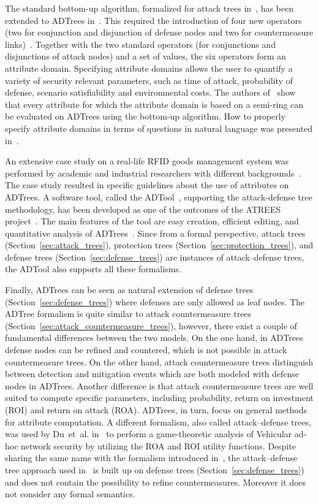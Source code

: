 \documentclass[a4paper]{article}
\begin{document}
The standard bottom-up algorithm, formalized for attack trees in~\cite{MaOo}, 
has been extended to ADTrees in~\cite{KoMaRaSc2}. This required the introduction
of four new operators (two for conjunction and disjunction of defense nodes and
two for countermeasure links)~\cite{KoMaRaSc2}. Together with the two standard
operators (for conjunctions and disjunctions of attack nodes) and a set of
values, the six operators form an attribute domain. Specifying attribute domains
allows the user to quantify a variety of security relevant parameters, such as
time of attack, probability of defense, scenario satisfiability and
environmental costs. The authors of~\cite{KoMaRaSc2} show that every attribute
for which the attribute domain is based on a semi-ring can be evaluated on
ADTrees using the bottom-up algorithm. How to properly specify attribute domains
in terms of questions in natural language was presented in~\cite{KoMaSc}.

An extensive case study on a real-life RFID goods management system was
performed by academic and industrial researchers with different
backgrounds~\cite{BaKoMeSc}. The case study resulted in specific guidelines
about the use of attributes on ADTrees. A software tool, called the 
ADTool~\cite{ADTool}, supporting the attack-defense tree methodology, has been
developed as one of the outcomes of the ATREES project~\cite{ATREES}. The main
features of the tool are easy  creation, efficient editing, and quantitative
analysis of  ADTrees~\cite{KoKoMaSc}.  Since from a formal perspective, attack
trees  (Section~\ref{sec:attack_trees}), protection trees 
(Section~\ref{sec:protection_trees}), and defense trees 
(Section~\ref{sec:defense_trees}) are instances of attack--defense trees, the 
ADTool also supports all these formalisms.

Finally, ADTrees can be seen as natural extension of defense trees 
(Section~\ref{sec:defense_trees}) where defenses are only allowed as leaf 
nodes.  The ADTree formalism is quite similar to attack countermeasure trees 
(Section~\ref{sec:attack_countermeasure_trees}), however, there exist a couple
of fundamental differences between the two models. On the one hand, in ADTrees
defense nodes can be refined and countered, which is not possible in attack
countermeasure trees. On the other hand, attack countermeasure trees 
distinguish between detection and mitigation events which are both modeled with
defense nodes in ADTrees. Another difference is that attack countermeasure trees
are well suited to compute specific parameters, including probability,  return
on investment (ROI) and return on attack (ROA). ADTrees, in  turn, focus on
general methods for attribute  computation. A different formalism, also called
attack--defense trees, was used by Du~et~al. in~\cite{DuLiDuZh} to perform a
game-theoretic analysis of Vehicular ad-hoc network security by utilizing the
ROA and ROI utility functions. Despite  sharing the same name with the formalism
introduced in~\cite{KoMaRaSc}, the attack--defense tree approach used
in~\cite{DuLiDuZh} is built up on defense trees
(Section~\ref{sec:defense_trees}) and does not contain the possibility  to
refine countermeasures. Moreover it does not consider any formal semantics.
\end{document}
